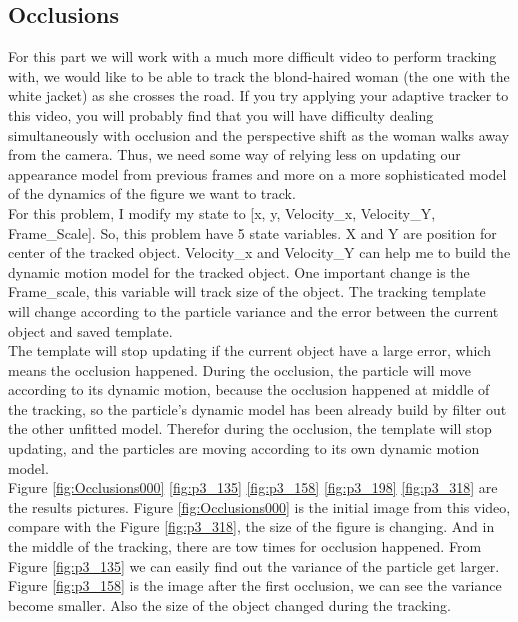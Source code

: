 \documentclass[10pt, conference, compsocconf]{IEEEtran}
\begin{document}
\subsection{Occlusions}
For this part we will work with a much more difficult video to perform tracking with, we would like to be able to track the blond-haired woman (the one with the white jacket) as she crosses the road. If you try applying your adaptive tracker to this video, you will probably find that you will have difficulty dealing simultaneously with occlusion and the perspective shift as the woman walks away from the camera. Thus, we need some way of relying less on updating our appearance model from previous frames and more on a more sophisticated model of the dynamics of the figure we want to track. \\
For this problem, I modify my state to [x, y, Velocity\_x, Velocity\_Y, Frame\_Scale]. So, this problem have 5 state variables. X and Y are position for center of the tracked object.  Velocity\_x and Velocity\_Y can help me to build the dynamic motion model for the tracked object. One important change is the Frame\_scale, this variable will track size of the object. The tracking template will change according to the particle variance and the error between the current object and saved template.\\ 
The template will stop updating if the current object have a large error, which means the occlusion happened.  
During the occlusion, the particle will move according to its dynamic motion, because the occlusion happened at middle of the tracking, so the particle’s dynamic model has been already build by filter out the other unfitted model. Therefor during the occlusion, the template will stop updating, and the particles are moving according to its own dynamic motion model.\\
Figure \ref{fig:Occlusions000} \ref{fig:p3_135} \ref{fig:p3_158} \ref{fig:p3_198} \ref{fig:p3_318} are the results pictures. Figure \ref{fig:Occlusions000} is the initial image from this video, compare with the Figure \ref{fig:p3_318}, the size of the figure is changing. And in the middle of the tracking, there are tow times for occlusion happened. From Figure \ref{fig:p3_135} we can easily find out the variance of the particle get larger. Figure \ref{fig:p3_158} is the image after the first occlusion, we can see the variance become smaller. Also the size of the object changed during the tracking. 
\end{document}
